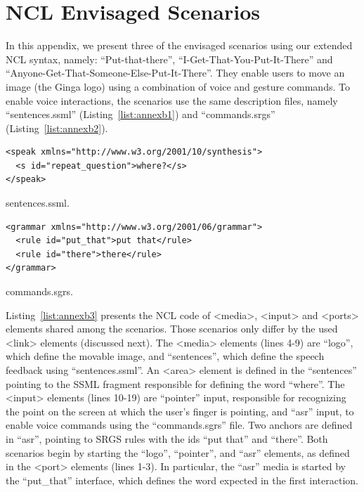 \documentclass[
  doutorado,
  american
]{ThesisPUC}
\newcommand{\lis}[1]{Listing~\ref{#1}}
\begin{document}
\chapter{NCL Envisaged Scenarios}
\label{annex:scenarios}

In this appendix, we present three of the envisaged scenarios using our extended
NCL syntax, namely: “Put-that-there”, “I-Get-That-You-Put-It-There” and
“Anyone-Get-That-Someone-Else-Put-It-There”. They enable users to move an image
(the Ginga logo) using a combination of voice and gesture commands. To enable
voice interactions, the scenarios use the same description files, namely
“sentences.ssml” (\lis{list:annexb1}) and “commands.srgs” 
(\lis{list:annexb2}).

\begin{listing}[h]
\begin{verbatim}
<speak xmlns="http://www.w3.org/2001/10/synthesis">
  <s id="repeat_question">where?</s>
</speak>
\end{verbatim}
\caption{sentences.ssml.}
\label{list:annexb1}
\end{listing}

\begin{listing}[h]
\begin{verbatim}
<grammar xmlns="http://www.w3.org/2001/06/grammar">
  <rule id="put_that">put that</rule>
  <rule id="there">there</rule>
</grammar>
\end{verbatim}
\caption{commands.sgrs.}
\label{list:annexb2}
\end{listing}

\lis{list:annexb3} presents the NCL code of <media>, <input> and <ports>
elements shared among the scenarios. Those scenarios only differ by the used
<link> elements (discussed next). The <media> elements (lines 4-9) are “logo”,
which define the movable image, and “sentences”, which define the speech
feedback using “sentences.ssml”. An <area> element is defined in the “sentences”
pointing to the SSML fragment responsible for defining the word “where”. The
<input> elements (lines 10-19) are “pointer” input, responsible for recognizing
the point on the screen at which the user’s finger is pointing, and “asr” input,
to enable voice commands using the “commands.sgrs” file. Two anchors are defined
in “asr”, pointing to SRGS rules with the ids “put that” and “there”. Both
scenarios begin by starting the “logo”, “pointer”, and “asr” elements, as
defined in the <port> elements (lines 1-3). In particular, the “asr” media is
started by the “put\_that” interface, which defines the word expected in the
first interaction.
\end{document}
